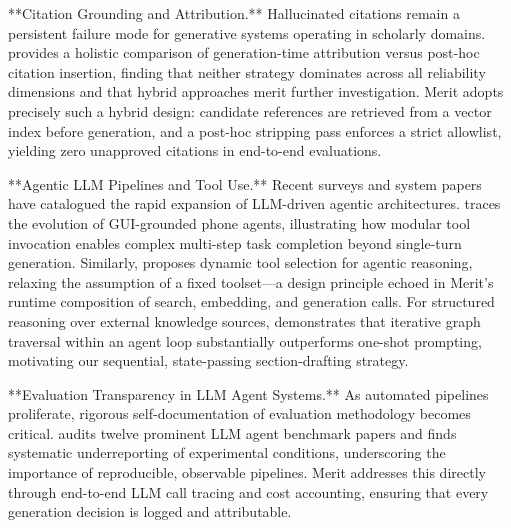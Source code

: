 \documentclass[11pt]{article}
\begin{document}
**Citation Grounding and Attribution.**
Hallucinated citations remain a persistent failure mode for generative systems operating in scholarly domains. \cite{arxiv_2509_21557} provides a holistic comparison of generation-time attribution versus post-hoc citation insertion, finding that neither strategy dominates across all reliability dimensions and that hybrid approaches merit further investigation. Merit adopts precisely such a hybrid design: candidate references are retrieved from a vector index before generation, and a post-hoc stripping pass enforces a strict allowlist, yielding zero unapproved citations in end-to-end evaluations.

**Agentic LLM Pipelines and Tool Use.**
Recent surveys and system papers have catalogued the rapid expansion of LLM-driven agentic architectures. \cite{arxiv_2504_19838} traces the evolution of GUI-grounded phone agents, illustrating how modular tool invocation enables complex multi-step task completion beyond single-turn generation. Similarly, \cite{arxiv_2512_13278} proposes dynamic tool selection for agentic reasoning, relaxing the assumption of a fixed toolset—a design principle echoed in Merit's runtime composition of search, embedding, and generation calls. For structured reasoning over external knowledge sources, \cite{arxiv_2402_11163} demonstrates that iterative graph traversal within an agent loop substantially outperforms one-shot prompting, motivating our sequential, state-passing section-drafting strategy.

**Evaluation Transparency in LLM Agent Systems.**
As automated pipelines proliferate, rigorous self-documentation of evaluation methodology becomes critical. \cite{arxiv_2605_21404} audits twelve prominent LLM agent benchmark papers and finds systematic underreporting of experimental conditions, underscoring the importance of reproducible, observable pipelines. Merit addresses this directly through end-to-end LLM call tracing and cost accounting, ensuring that every generation decision is logged and attributable.
\end{document}
